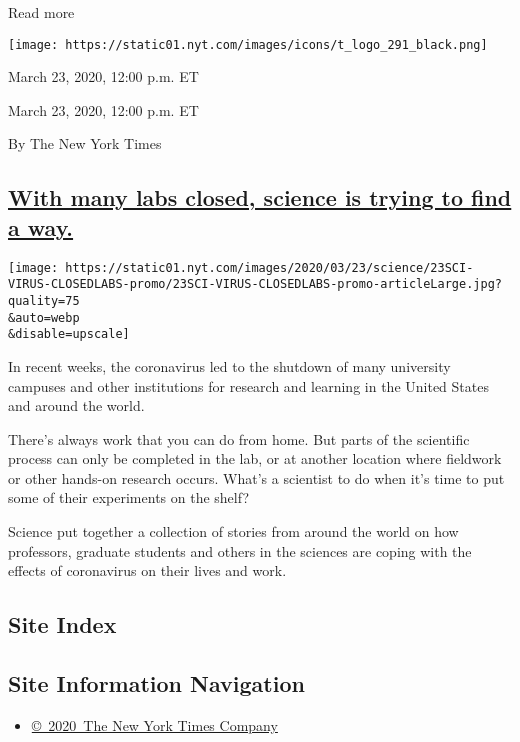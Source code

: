 Read more

\texttt{[image: https://static01.nyt.com/images/icons/t\_logo\_291\_black.png]}

March 23, 2020, 12:00 p.m. ET

March 23, 2020, 12:00 p.m. ET

By The New York Times

\hypertarget{with-many-labs-closed-science-is-trying-to-find-a-way}{%
\subsection{\texorpdfstring{\protect\hyperlink{with-many-labs-closed-science-is-trying-to-find-a-way}{With
many labs closed, science is trying to find a
way.}}{With many labs closed, science is trying to find a way.}}\label{with-many-labs-closed-science-is-trying-to-find-a-way}}

\texttt{[image: https://static01.nyt.com/images/2020/03/23/science/23SCI-VIRUS-CLOSEDLABS-promo/23SCI-VIRUS-CLOSEDLABS-promo-articleLarge.jpg?quality=75\\\&auto=webp\\\&disable=upscale]}

In recent weeks, the coronavirus led to the shutdown of many university
campuses and other institutions for research and learning in the United
States and around the world.

There's always work that you can do from home. But parts of the
scientific process can only be completed in the lab, or at another
location where fieldwork or other hands-on research occurs. What's a
scientist to do when it's time to put some of their experiments on the
shelf?

Science put together a collection of stories from around the world on
how professors, graduate students and others in the sciences are coping
with the effects of coronavirus on their lives and work.

\hypertarget{site-index}{%
\subsection{Site Index}\label{site-index}}

\hypertarget{site-information-navigation}{%
\subsection{Site Information
Navigation}\label{site-information-navigation}}

\begin{itemize}
\tightlist
\item
  \href{https://help.nytimes.com/hc/en-us/articles/115014792127-Copyright-notice}{©~2020~The
  New York Times Company}
\end{itemize}

